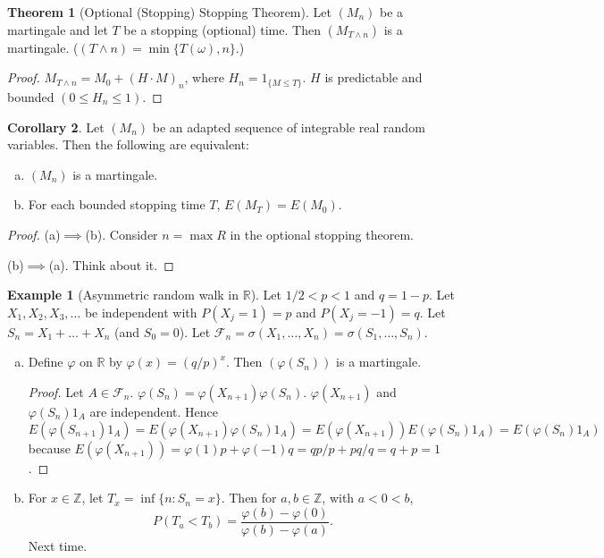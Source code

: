 \documentclass{article}
\newcommand{\R}{\mathbb{R}}
\newcommand{\Z}{\mathbb{Z}}
\newcommand{\F}{\mathscr{F}}
\theoremstyle{definition}
\newtheorem{theorem}{Theorem}
\newtheorem{corollary}[theorem]{Corollary}
\newtheorem*{example}{Example}
\begin{document}
\begin{theorem}[Optional (Stopping) Stopping Theorem]
    Let $(M_n)$ be a martingale and let $T$ be a stopping (optional) time. Then $(M_{T \wedge n})$ is a martingale. ($(T \wedge n) = \min\{T(\omega), n\}$.)
\end{theorem}
\begin{proof}
    $M_{T \wedge n} = M_0 + (H \cdot M)_n$, where $H_n = 1_{\{M \leq T\}}$. $H$ is predictable and bounded $(0 \leq H_n \leq 1)$.
\end{proof}
\begin{corollary}
    Let $(M_n)$ be an adapted sequence of integrable real random variables. Then the following are equivalent:
    \begin{enumerate}[(a)]
        \item $(M_n)$ is a martingale.
        \item For each bounded stopping time $T$, $E(M_T) = E(M_0)$.
    \end{enumerate}
\end{corollary}
\begin{proof}
    (a)$\implies$(b). Consider $n = \max R$ in the optional stopping theorem.
    
    (b)$\implies$(a). Think about it.
\end{proof}

\begin{example}[Asymmetric random walk in $\R$]
Let $1/2 < p < 1$ and $q = 1-p$. Let $X_1, X_2, X_3, \dots$ be independent with $P(X_j = 1) = p$ and $P(X_j = -1) = q$. Let $S_n = X_1 + \dots + X_n$ (and $S_0 = 0$). Let $\F_n = \sigma(X_1, \dots, X_n) = \sigma(S_1, \dots, S_n)$.
\begin{enumerate}[(a)]
    \item Define $\varphi$ on $\R$ by $\varphi(x) = (q/p)^x$. Then $(\varphi(S_n))$ is a martingale.
    \begin{proof}
        Let $A \in \F_n$. $\varphi(S_n) = \varphi(X_{n+1})\varphi(S_n)$. $\varphi(X_{n+1})$ and $\varphi(S_n)1_A$ are independent. Hence 
        \[
            E(\varphi(S_{n+1})1_A) = E(\varphi(X_{n+1})\varphi(S_n)1_A) = E(\varphi(X_{n+1}))E(\varphi(S_n)1_A) = E(\varphi(S_n)1_A)
        \]
        because $E(\varphi(X_{n+1})) = \varphi(1)p + \varphi(-1)q = qp/p + pq/q = q + p = 1$.
    \end{proof}
    \item For $x \in \Z$, let $T_x = \inf\{n : S_n = x\}$. Then for $a, b \in \Z$, with $a < 0 < b$,
    \[P(T_a < T_b) = \frac{\varphi(b) - \varphi(0)}{\varphi(b) - \varphi(a)}.\]
    \proof Next time.
\end{enumerate}
\end{example}
\end{document}
